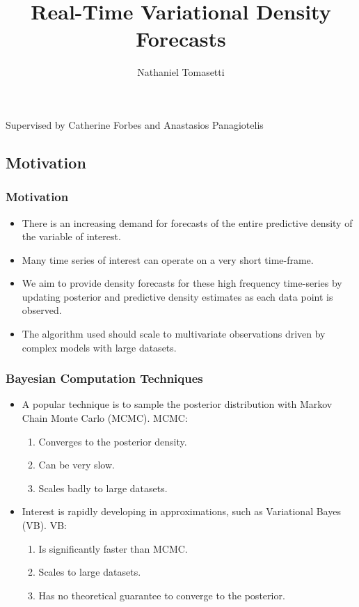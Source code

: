 \documentclass{beamer}\usepackage[]{graphicx}\usepackage[]{color}
\title[Real-Time Variational Density Forecasts]{Real-Time Variational Density Forecasts}
\author[Nathaniel Tomasetti]{Nathaniel Tomasetti}
\date{ }
\begin{document}
\begin{frame}
\titlepage
\centering
Supervised by Catherine Forbes and Anastasios Panagiotelis
\end{frame}


\begin{frame}
\tableofcontents
\end{frame}


\begin{frame}
\section{Motivation}
\frametitle{Motivation}
\begin{itemize}
\item There is an increasing demand for forecasts of the entire predictive density of the variable of interest.
\item Many time series of interest can operate on a very short time-frame.
\item We aim to provide density forecasts for these high frequency time-series by updating posterior and predictive density estimates as each data point is observed.
\item The algorithm used should scale to multivariate observations driven by complex models with large datasets.
\end{itemize}
\end{frame}


\begin{frame}
\frametitle{Bayesian Computation Techniques}
\begin{itemize}
\item A popular technique is to sample the posterior distribution with Markov Chain Monte Carlo (MCMC). MCMC:
\begin{enumerate}
\item Converges to the posterior density.
\item Can be very slow.
\item Scales badly to large datasets.
\end{enumerate}
\item Interest is rapidly developing in approximations, such as Variational Bayes (VB). VB:
\begin{enumerate}
\item Is significantly faster than MCMC.
\item Scales to large datasets.
\item Has no theoretical guarantee to converge to the posterior.
\end{enumerate}
\end{itemize}
\end{frame}
\end{document}
